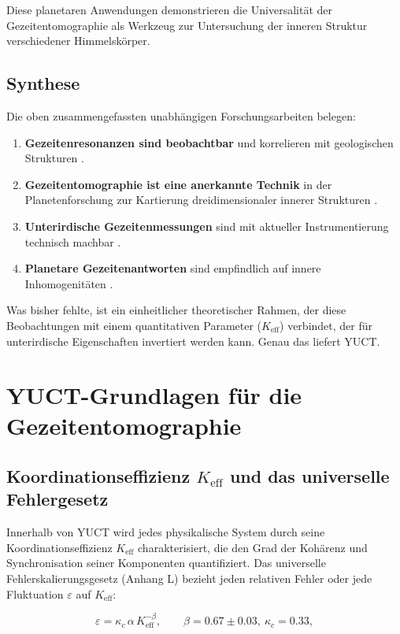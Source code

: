 \documentclass[12pt,a4paper]{article}
\theoremstyle{remark}
\newcommand{\Keff}{K_{\mathrm{eff}}}
\newcommand{\kappac}{\kappa_c}
\newcommand{\eps}{\varepsilon}
\begin{document}
	Diese planetaren Anwendungen demonstrieren die Universalität der Gezeitentomographie als Werkzeug zur Untersuchung der inneren Struktur verschiedener Himmelskörper.
	
	\subsection{Synthese}
	
	Die oben zusammengefassten unabhängigen Forschungsarbeiten belegen:
	
	\begin{enumerate}
		\item \textbf{Gezeitenresonanzen sind beobachtbar} und korrelieren mit geologischen Strukturen \cite{Sibgatulin2014}.
		\item \textbf{Gezeitentomographie ist eine anerkannte Technik} in der Planetenforschung zur Kartierung dreidimensionaler innerer Strukturen \cite{RoviraNavarro2025}.
		\item \textbf{Unterirdische Gezeitenmessungen} sind mit aktueller Instrumentierung technisch machbar \cite{Rogister2024}.
		\item \textbf{Planetare Gezeitenantworten} sind empfindlich auf innere Inhomogenitäten \cite{Briaud2025}.
	\end{enumerate}
	
	Was bisher fehlte, ist ein einheitlicher theoretischer Rahmen, der diese Beobachtungen mit einem quantitativen Parameter ($\Keff$) verbindet, der für unterirdische Eigenschaften invertiert werden kann. Genau das liefert YUCT.
	
	\section{YUCT-Grundlagen für die Gezeitentomographie}
	\label{sec:yuct-foundations}
	
	\subsection{Koordinationseffizienz $\Keff$ und das universelle Fehlergesetz}
	
	Innerhalb von YUCT wird jedes physikalische System durch seine Koordinationseffizienz $\Keff$ charakterisiert, die den Grad der Kohärenz und Synchronisation seiner Komponenten quantifiziert. Das universelle Fehlerskalierungsgesetz (Anhang L) bezieht jeden relativen Fehler oder jede Fluktuation $\eps$ auf $\Keff$:
	
	\begin{equation}
		\eps = \kappac \, \alpha \, \Keff^{-\beta}, \qquad \beta = 0.67 \pm 0.03,\ \kappac = 0.33,
		\label{eq:universal-scaling}
	\end{equation}
	
\end{document}
